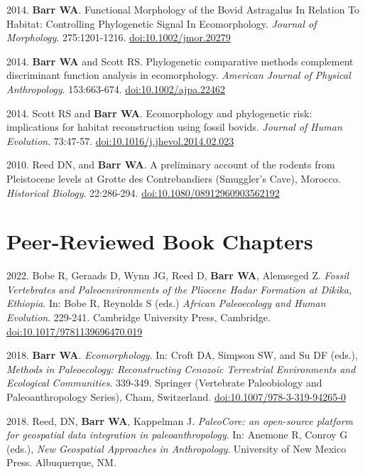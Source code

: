 \begin{etaremune}
\item  2014. {\bfseries Barr WA}. Functional Morphology of the Bovid Astragalus In Relation To Habitat: Controlling Phylogenetic Signal In Ecomorphology. \emph{Journal of Morphology}. 275:1201-1216. \href{http://dx.doi.org/10.1002/jmor.20279}{doi:10.1002/jmor.20279}

\item  2014. {\bfseries Barr WA} and Scott RS. Phylogenetic comparative methods complement discriminant function analysis in ecomorphology. \emph{American Journal of Physical Anthropology}. 153:663-674. \href{http://dx.doi.org/10.1002/ajpa.22462}{doi:10.1002/ajpa.22462}

\item  2014. Scott RS and {\bfseries Barr WA}. Ecomorphology and phylogenetic risk: implications for habitat reconstruction using fossil bovids. \emph{Journal of Human Evolution}. 73:47-57. \href{http://dx.doi.org/10.1016/j.jhevol.2014.02.023}{doi:10.1016/j.jhevol.2014.02.023}


\item  2010. Reed DN, and {\bfseries Barr WA}. A preliminary account of the rodents from Pleistocene levels at Grotte des Contrebandiers (Smuggler's Cave), Morocco. \emph{Historical Biology}. 22:286-294. \href{http://dx.doi.org/10.1080/08912960903562192}{doi:10.1080/08912960903562192}

\end{etaremune}

\section*{Peer-Reviewed Book Chapters}


\begin{etaremune} 

\item 2022.  Bobe R, Geraads D, Wynn JG, Reed D, {\bfseries Barr WA}, Alemseged Z. \emph{Fossil Vertebrates and Paleoenvironments of the Pliocene Hadar Formation at Dikika, Ethiopia}. In: Bobe R, Reynolds S (eds.) \emph{African Paleoecology and Human Evolution}. 229-241. Cambridge University Press, Cambridge. \href{https://doi.org/10.1017/9781139696470.019}{doi:10.1017/9781139696470.019}

\item 2018. {\bfseries Barr WA}. \emph{Ecomorphology}. In: Croft DA, Simpson SW, and Su DF (eds.), \emph{Methods in Paleoecology: Reconstructing Cenozoic Terrestrial Environments and Ecological Communities}. 339-349. Springer (Vertebrate Paleobiology and Paleoanthropology Series), Cham, Switzerland. \href{https://doi.org/10.1007/978-3-319-94265-0}{doi:10.1007/978-3-319-94265-0}

\item 2018. Reed, DN, {\bfseries Barr WA}, Kappelman J. \emph{PaleoCore: an open-source platform for geospatial data integration in paleoanthropology}. In: Anemone R, Conroy G (eds.), \emph{New Geospatial Approaches in Anthropology}. University of New Mexico Press. Albuquerque, NM.

\end{etaremune}